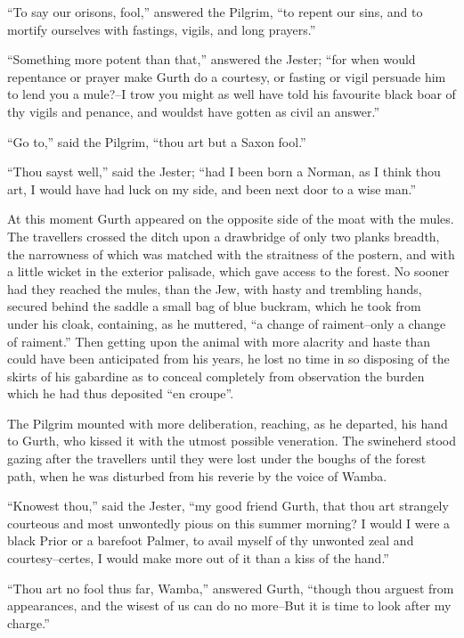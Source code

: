 ``To say our orisons, fool,'' answered the Pilgrim, ``to repent our
sins, and to mortify ourselves with fastings, vigils, and long
prayers.''

``Something more potent than that,'' answered the Jester; ``for when
would repentance or prayer make Gurth do a courtesy, or fasting or vigil
persuade him to lend you a mule?--I trow you might as well have told his
favourite black boar of thy vigils and penance, and wouldst have gotten
as civil an answer.''

``Go to,'' said the Pilgrim, ``thou art but a Saxon fool.''

``Thou sayst well,'' said the Jester; ``had I been born a Norman, as I
think thou art, I would have had luck on my side, and been next door to
a wise man.''

At this moment Gurth appeared on the opposite side of the moat with the
mules. The travellers crossed the ditch upon a drawbridge of only two
planks breadth, the narrowness of which was matched with the straitness
of the postern, and with a little wicket in the exterior palisade, which
gave access to the forest. No sooner had they reached the mules, than
the Jew, with hasty and trembling hands, secured behind the saddle a
small bag of blue buckram, which he took from under his cloak,
containing, as he muttered, ``a change of raiment--only a change of
raiment.'' Then getting upon the animal with more alacrity and haste
than could have been anticipated from his years, he lost no time in so
disposing of the skirts of his gabardine as to conceal completely from
observation the burden which he had thus deposited ``en croupe''.

The Pilgrim mounted with more deliberation, reaching, as he departed,
his hand to Gurth, who kissed it with the utmost possible veneration.
The swineherd stood gazing after the travellers until they were lost
under the boughs of the forest path, when he was disturbed from his
reverie by the voice of Wamba.

``Knowest thou,'' said the Jester, ``my good friend Gurth, that thou art
strangely courteous and most unwontedly pious on this summer morning? I
would I were a black Prior or a barefoot Palmer, to avail myself of thy
unwonted zeal and courtesy--certes, I would make more out of it than a
kiss of the hand.''

``Thou art no fool thus far, Wamba,'' answered Gurth, ``though thou
arguest from appearances, and the wisest of us can do no more--But it is
time to look after my charge.''

